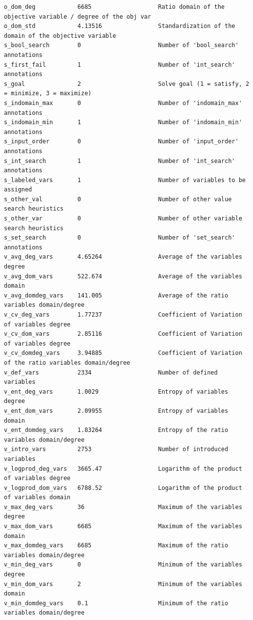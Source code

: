 \documentclass[../../main]{subfiles}
\begin{document}
\begin{lstlisting}
o_dom_deg            6685                   Ratio domain of the objective variable / degree of the obj var
o_dom_std            4.13516                Standardization of the domain of the objective variable
s_bool_search        0                      Number of 'bool_search' annotations
s_first_fail         1                      Number of 'int_search' annotations
s_goal               2                      Solve goal (1 = satisfy, 2 = minimize, 3 = maximize)
s_indomain_max       0                      Number of 'indomain_max' annotations
s_indomain_min       1                      Number of 'indomain_min' annotations
s_input_order        0                      Number of 'input_order' annotations
s_int_search         1                      Number of 'int_search' annotations
s_labeled_vars       1                      Number of variables to be assigned
s_other_val          0                      Number of other value search heuristics
s_other_var          0                      Number of other variable search heuristics
s_set_search         0                      Number of 'set_search' annotations
v_avg_deg_vars       4.65264                Average of the variables degree
v_avg_dom_vars       522.674                Average of the variables domain
v_avg_domdeg_vars    141.005                Average of the ratio variables domain/degree
v_cv_deg_vars        1.77237                Coefficient of Variation of variables degree
v_cv_dom_vars        2.85116                Coefficient of Variation of variables degree
v_cv_domdeg_vars     3.94885                Coefficient of Variation of the ratio variables domain/degree
v_def_vars           2334                   Number of defined variables
v_ent_deg_vars       1.0029                 Entropy of variables degree
v_ent_dom_vars       2.09955                Entropy of variables domain
v_ent_domdeg_vars    1.83264                Entropy of the ratio variables domain/degree
v_intro_vars         2753                   Number of introduced variables
v_logprod_deg_vars   3665.47                Logarithm of the product of variables degree
v_logprod_dom_vars   6788.52                Logarithm of the product of variables domain
v_max_deg_vars       36                     Maximum of the variables degree
v_max_dom_vars       6685                   Maximum of the variables domain
v_max_domdeg_vars    6685                   Maximum of the ratio variables domain/degree
v_min_deg_vars       0                      Minimum of the variables degree
v_min_dom_vars       2                      Minimum of the variables domain
v_min_domdeg_vars    0.1                    Minimum of the ratio variables domain/degree

\end{lstlisting}
\end{document}
